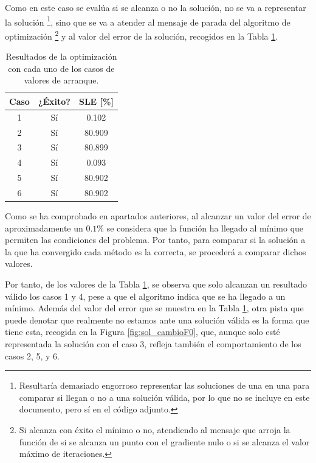 Como en este caso se evalúa si se alcanza o no la solución, no se va a representar la solución \footnote{Resultaría demasiado engorroso representar las soluciones de una en una para comparar si llegan o no a una solución válida, por lo que no se incluye en este documento, pero sí en el código adjunto.}, sino que se va a atender al mensaje de parada del algoritmo de optimización \footnote{Si alcanza con éxito el mínimo o no, atendiendo al mensaje que arroja la función de si se alcanza un punto con el gradiente nulo o si se alcanza el valor máximo de iteraciones.} y al valor del error de la solución, recogidos en la Tabla \ref{tab:variar_F}.

\begin{table}[h]
    \centering
    \caption{Resultados de la optimización con cada uno de los casos de valores de arranque.} 
    \begin{tabular}{|c|c|c|}
        \hline
        \textbf{Caso} & \textbf{¿Éxito?} & \textbf{SLE [\%]} \\ \hline \hline
        1 & Sí &  0.102 \\ \hline
        2 & Sí & 80.909 \\ \hline
        3 & Sí & 80.899 \\ \hline
        4 & Sí &  0.093 \\ \hline
        5 & Sí & 80.902 \\ \hline
        6 & Sí & 80.902 \\ \hline
    \end{tabular}
    \label{tab:variar_F}
\end{table}

Como se ha comprobado en apartados anteriores, al alcanzar un valor del error de aproximadamente un $0.1 \% $ se considera que la función ha llegado al mínimo que permiten las condiciones del problema. Por tanto, para comparar si la solución a la que ha convergido cada método es la correcta, se procederá a comparar dichos valores.

Por tanto, de los valores de la Tabla \ref{tab:variar_F}, se observa que solo alcanzan un resultado válido los casos 1 y 4, pese a que el algoritmo indica que se ha llegado a un mínimo. Además del valor del error que se muestra en la Tabla \ref{tab:variar_F}, otra pista que puede denotar que realmente no estamos ante una solución válida es la forma que tiene esta, recogida en la Figura \ref{fig:sol_cambioF0}, que, aunque solo esté representada la solución con el caso 3, refleja también el comportamiento de los casos 2, 5, y 6.

